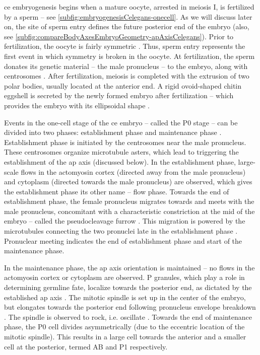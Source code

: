 \ac{ce} embryogenesis begins when a mature oocyte, arrested in meiosis I, is fertilized by a sperm \citep{rose2014polarity,begasse2011} -- see \autoref{subfig:embryogenesisCelegans-onecell}. As we will discuss later on, the site of sperm entry defines the future posterior end of the embryo \citep{goldstein1996specification} (also, see \autoref{subfig:compareBodyAxesEmbryoGeometry-apAxisCelegans}). Prior to fertilization, the oocyte is fairly symmetric \citep{cuenca2003polarization,cowan2004asymmetric,schonegg2006cdc}. Thus, sperm entry represents the first event in which symmetry is broken in the oocyte. At fertilization, the sperm donates its genetic material -- the male pronucleus -- to the embryo, along with centrosomes \citep{o2000spd,wallenfang2000polarization,cowan2004centrosomes}. After fertilization, meiosis is completed with the extrusion of two polar bodies, usually located at the anterior end. A rigid ovoid-shaped chitin eggshell is secreted by the newly formed embryo after fertilization -- which provides the embryo with its ellipsoidal shape \citep{johnston2012eggshell}.

Events in the one-cell stage of the \ac{ce} embryo -- called the P0 stage -- can be divided into two phases: establishment phase and maintenance phase \citep{cuenca2003polarization}. Establishment phase is initiated by the centrosomes near the male pronucleus. These centrosomes organize microtubule asters, which lead to triggering the establishment of the \ac{ap} axis (discussed below). In the establishment phase, large-scale flows in the actomyosin cortex (directed away from the male pronucleus) and cytoplasm (directed towards the male pronucleus) are observed, which gives the establishment phase its other name -- flow phase. Towards the end of establishment phase, the female pronucleus migrates towards and meets with the male pronucleus, concomitant with a characteristic constriction at the mid of the embryo -- called the pseudocleavage furrow \citep{cuenca2003polarization,nigon1960architecture,reymann2016cortical}. This migration is powered by the microtubules connecting the two pronuclei late in the establishment phase \citep{niwayama2011hydrodynamic}. Pronuclear meeting indicates the end of establishment phase and start of the maintenance phase.

In the maintenance phase, the \ac{ap} axis orientation is maintained -- no flows in the actomyosin cortex or cytoplasm are observed. P granules, which play a role in determining germline fate, localize towards the posterior end, as dictated by the established \ac{ap} axis \citep{gonczy2008mechanisms,hoege2013principles}. The mitotic spindle is set up in the center of the embryo, but elongates towards the posterior end following pronucleus envelope breakdown \citep{grill2003distribution}. The spindle is observed to rock, i.e. oscillate \citep{grill2005theory}. Towards the end of maintenance phase, the P0 cell divides asymmetrically (due to the eccentric location of the mitotic spindle). This results in a large cell towards the anterior and a smaller cell at the posterior, termed AB and P1 respectively. 

